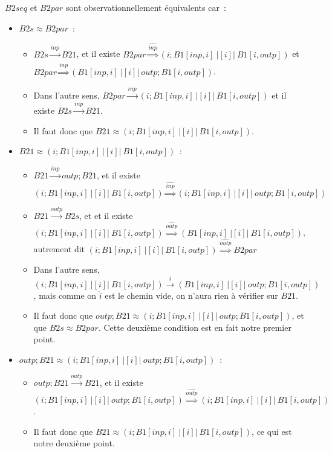 \documentclass[a4paper,french,12pt]{article}
\def\transition#1{\stackrel{#1}{\longrightarrow}}
\def\Transition#1{\stackrel{#1}{\Longrightarrow}}
\def\observationnelle{\approx}
\begin{document}
{\raggedright
  $B2seq$ et $B2par$ sont observationnellement équivalents car~:
  \begin{itemize}
  \item $B2s \observationnelle B2par$~:
    \begin{itemize}
    \item $B2s\transition{inp} B21$,
      et il existe $B2par \Transition{\hat{inp}} (i;B1[inp,i] \ |[i]|\ B1[i,outp])$
      et $B2par \Transition{\hat{inp}} (B1[inp,i] \ |[i]|\ outp;B1[i,outp])$.
    \item Dans l'autre sens,
      $B2par \transition{inp} (i;B1[inp,i] \ |[i]|\ B1[i,outp])$
      et il existe $B2s\transition{inp} B21$.
    \item Il faut donc que $B21 \observationnelle (i;B1[inp,i] \ |[i]|\ B1[i,outp])$.
    \end{itemize}
  \item $B21 \observationnelle (i;B1[inp,i] \ |[i]|\ B1[i,outp])$~:
    \begin{itemize}
    \item $B21 \transition{inp} outp;B21$,
      et il existe
      $(i;B1[inp,i] \ |[i]|\  B1[i,outp]) \Transition{\hat{inp}} (i;B1[inp,i] \ |[i]|\ outp;B1[i,outp])$
    \item $B21 \transition{outp} B2s$, et
      et il existe
      $(i;B1[inp,i] \ |[i]|\  B1[i,outp]) \Transition{\hat{outp}} (B1[inp,i] \ |[i]|\ B1[i,outp])$,
      autrement dit
      $(i;B1[inp,i] \ |[i]|\  B1[i,outp]) \Transition{\hat{outp}} B2par$
    \item Dans l'autre sens,
      $(i;B1[inp,i] \ |[i]|\ B1[i,outp]) \transition{i} (B1[inp,i] \ |[i]|\ outp;B1[i,outp])$,
      mais comme on $\hat{i}$ est le chemin vide, on n'aura rien à vérifier sur $B21$.
    \item Il faut donc que $outp;B21 \observationnelle (i;B1[inp,i] \ |[i]|\ outp;B1[i,outp])$,
      et que $B2s \observationnelle B2par$. Cette deuxième condition est en fait notre premier point.
    \end{itemize}
  \item $outp;B21 \observationnelle (i;B1[inp,i] \ |[i]|\ outp;B1[i,outp])$~:
    \begin{itemize}
    \item $outp;B21 \transition{outp}B21$,
      et il existe
      $(i;B1[inp,i] \ |[i]|\ outp;B1[i,outp]) \Transition{\hat{outp}} (i;B1[inp,i] \ |[i]|\ B1[i,outp])$.
    \item Il faut donc que $B21 \observationnelle (i;B1[inp,i] \ |[i]|\ B1[i,outp])$, ce qui est notre deuxième point.
    \end{itemize}
  \end{itemize}
}
\end{document}

